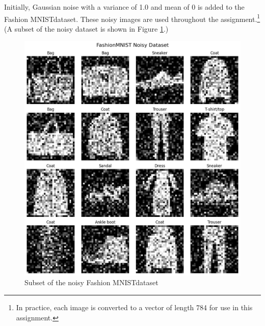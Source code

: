 \documentclass[12pt]{article}
\newcommand{\fm}{Fashion MNIST}
\begin{document}
	Initially, Gaussian noise with a variance of 1.0 and mean of 0 is added to the \fm dataset. These noisy images are used throughout the assignment.\footnote{In practice, each image is converted to a vector of length 784 for use in this assignment.} (A subset of the noisy dataset is shown in Figure \ref{fig: fmn data noisy}.)
	\begin{figure}[H]
		\centering
		\includegraphics[scale=0.5]{figs/fmn data noisy}
		\caption{Subset of the noisy \fm dataset}
		\label{fig: fmn data noisy}
	\end{figure}
	\newpage
\end{document}
